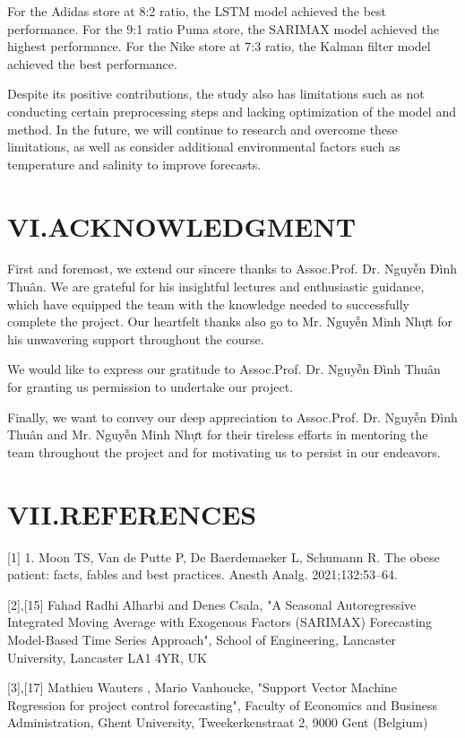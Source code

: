 \documentclass[conference]{IEEEtran}
\begin{document}
{For the Adidas store at 8:2 ratio, the LSTM model achieved the best performance. For the 9:1 ratio Puma store, the SARIMAX model achieved the highest performance. For the Nike store at 7:3 ratio, the Kalman filter model achieved the best performance.

Despite its positive contributions, the study also has limitations such as not conducting certain preprocessing steps and lacking optimization of the model and method. In the future, we will continue to research and overcome these limitations, as well as consider additional environmental factors such as temperature and salinity to improve forecasts.

\section*{VI.ACKNOWLEDGMENT}

First and foremost, we extend our sincere thanks to Assoc.Prof. Dr. Nguyễn Đình Thuân. We are grateful for his insightful lectures and enthusiastic guidance, which have equipped the team with the knowledge needed to successfully complete the project. Our heartfelt thanks also go to Mr. Nguyễn Minh Nhựt for his unwavering support throughout the course.

We would like to express our gratitude to Assoc.Prof. Dr. Nguyễn Đình Thuân for granting us permission to undertake our project.

Finally, we want to convey our deep appreciation to Assoc.Prof. Dr. Nguyễn Đình Thuân and Mr. Nguyễn Minh Nhựt for their tireless efforts in mentoring the team throughout the project and for motivating us to persist in our endeavors.

\section*{VII.REFERENCES}
[1] 1. Moon TS, Van de Putte P, De Baerdemaeker L, Schumann R. The obese patient: facts, fables and best practices. Anesth Analg. 2021;132:53–64.

[2],[15] Fahad Radhi Alharbi  and Denes Csala, "A Seasonal Autoregressive Integrated Moving Average with Exogenous Factors (SARIMAX) Forecasting Model-Based Time Series Approach", School of Engineering, Lancaster University, Lancaster LA1 4YR, UK

[3],[17] Mathieu Wauters , Mario Vanhoucke, "Support Vector Machine Regression for project control forecasting", Faculty of Economics and Business Administration, Ghent University, Tweekerkenstraat 2, 9000 Gent (Belgium)

}
\end{document}
